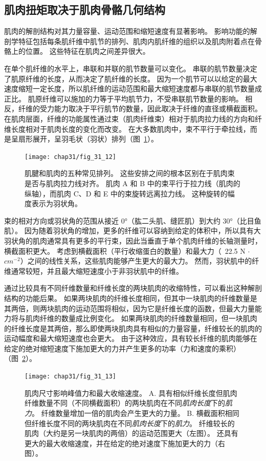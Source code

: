 \subsection{肌肉扭矩取决于肌肉骨骼几何结构}

肌肉的解剖结构对其力量容量、运动范围和缩短速度有显著影响。
影响功能的解剖学特征包括每条肌纤维中肌节的排列、肌肉内肌纤维的组织以及肌肉附着点在骨骼上的位置。
这些特征在肌肉之间差异很大。


在单个肌纤维的水平上，串联和并联的肌节数量可以变化。
串联的肌节数量决定了肌原纤维的长度，从而决定了肌纤维的长度。
因为一个肌节可以以给定的最大速度缩短一定长度，所以肌纤维的运动范围和最大缩短速度都与串联的肌节数量成正比。
肌原纤维可以施加的力等于平均肌节力，不受串联肌节数量的影响。
相反，纤维的受力能力取决于平行肌节的数量，因此取决于纤维的直径或横截面积。
在肌肉层面，纤维的功能属性通过束（肌肉纤维束）相对于肌肉拉力线的方向和纤维长度相对于肌肉长度的变化而改变。
在大多数肌肉中，束不平行于牵拉线，而是呈扇形展开，呈羽毛状（羽状）排列（图~\ref{fig:31_12}）。


\begin{figure}[htbp]
	\centering
	\texttt{[image: chap31/fig\_31\_12]}
	\caption{肌腱和肌肉的五种常见排列。
	这些安排之间的根本区别在于肌肉束是否与肌肉拉力线对齐。
	肌肉 A 和 B 中的束平行于拉力线（肌肉的纵轴），而肌肉 C、D 和 E 中的束旋转远离拉力线。
	这种旋转的幅度表示为羽状角\cite{winters2012multiple}。}
	\label{fig:31_12}
\end{figure}


束的相对方向或羽状角的范围从接近 0°（肱二头肌、缝匠肌）到大约 30°（比目鱼肌）。
因为随着羽状角的增加，更多的纤维可以容纳到给定的体积中，所以具有大羽状角的肌肉通常具有更多的平行束，因此当垂直于单个肌肉纤维的长轴测量时，横截面积更大。
考虑到横截面积（平行收缩蛋白的数量）和最大力（~22.5 N $\cdot$ $ cm^{-2} $）之间的线性关系，这些肌肉能够产生更大的最大力。
然而，羽状肌中的纤维通常较短，并且最大缩短速度小于非羽状肌中的纤维。


通过比较具有不同纤维数量和纤维长度的两块肌肉的收缩特性，可以看出这种解剖结构的功能后果。
如果两块肌肉的纤维长度相同，但其中一块肌肉的纤维数量是其两倍，则两块肌肉的运动范围将相似，因为它是纤维长度的函数，但最大力量能力将与肌肉纤维的数量成比例变化。
如果两块肌肉的纤维数量相同，但一块肌肉的纤维长度是其两倍，那么即使两块肌肉具有相似的力量容量，纤维较长的肌肉的运动幅度和最大缩短速度也会更大。
由于这种效应，具有较长纤维的肌肉能够在给定的绝对缩短速度下施加更大的力并产生更多的功率（力和速度的乘积）（图~\ref{fig:31_13}）。


\begin{figure}[htbp]
	\centering
	\texttt{[image: chap31/fig\_31\_13]}
	\caption{肌肉尺寸影响峰值力和最大收缩速度\cite{lieber2000functional}。
	A. 具有相似纤维长度但肌肉纤维数量不同（不同横截面积）的两块肌肉在不同\textit{肌肉长度}下的\textit{肌力}。
	纤维数量增加一倍的肌肉会产生更大的力量。
	B. 横截面积相同但纤维长度不同的两块肌肉在不同\textit{肌肉长度}下的\textit{肌力}。
	纤维较长的肌肉（大约是另一块肌肉的两倍）的运动范围更大（左图）。 
	还具有更大的最大收缩速度，并在给定的绝对速度下施加更大的力（右图）。}
	\label{fig:31_13}
\end{figure}


